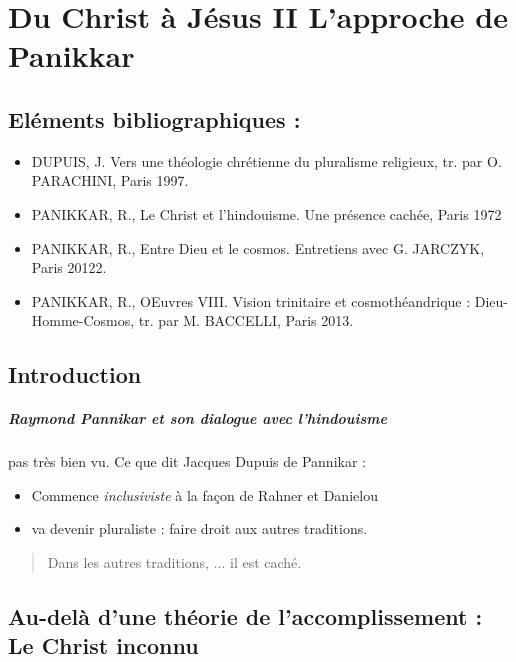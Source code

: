 \chapter{Du Christ à Jésus II
L’approche de Panikkar
}


\section{Eléments bibliographiques :}

\begin{itemize}
    \item DUPUIS, J. Vers une théologie chrétienne du
pluralisme religieux, tr. par O. PARACHINI,
Paris 1997.
    \item PANIKKAR, R., Le Christ et l’hindouisme. Une présence cachée, Paris 1972
    \item PANIKKAR, R., Entre Dieu et le cosmos. Entretiens avec G. JARCZYK, Paris 20122.
    \item PANIKKAR, R., OEuvres VIII. Vision trinitaire et cosmothéandrique : Dieu-Homme-Cosmos, tr.
par M. BACCELLI, Paris 2013.
\end{itemize}

\section{Introduction}


\paragraph{Raymond Pannikar et son dialogue avec l'hindouisme} pas très bien vu. 
Ce que dit Jacques Dupuis de Pannikar : 
\begin{itemize}
    \item Commence \textit{inclusiviste} à la façon de Rahner et Danielou
    \item va devenir pluraliste : faire droit aux autres traditions.
\end{itemize}
\begin{quote}
    Dans les autres traditions, ... il est caché.
  
\end{quote}


  
\section{Au-delà d’une théorie de l’accomplissement : Le Christ inconnu
}

